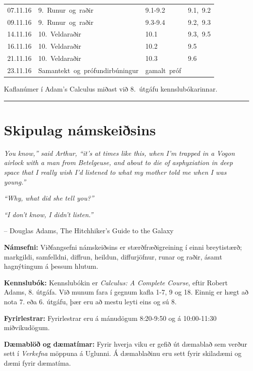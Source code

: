 \documentclass[b5paper,11pt,icelandic]{sphinxmanual}
\begin{document}
\begin{longtable}{c|l|l|l}
\hline

07.11.16&
9.~Runur~og~raðir&
9.1-9.2&
9.1,~9.2\\
09.11.16&
9.~Runur~og~raðir&
9.3-9.4&
9.2,~9.3\\

\hline

14.11.16&
10.~Veldaraðir&
10.1&
9.3,~9.5\\
16.11.16&
10.~Veldaraðir&
10.2&
9.5\\

\hline

21.11.16&
10.~Veldaraðir&
10.3&
9.6\\
23.11.16&
Samantekt~og~prófundirbúningur&
gamalt~próf&
\\
\hline
\end{longtable}


Kaflanúmer í Adam’s Calculus miðast við 8. útgáfu kennslubókarinnar.


\bigskip\hrule{}\bigskip

\newpage
 
\section{Skipulag námskeiðsins}
\label{vidauki:skipulag-namskeisins}
\emph{You know,'' said Arthur, ``it's at times like this, when I'm trapped in a
Vogon airlock with a man from Betelgeuse, and about to die of asphyxiation
in deep space that I really wish I'd listened to what my mother told me when I was young.''}

\emph{``Why, what did she tell you?''}

\emph{``I don't know, I didn't listen.”}

-- Douglas Adams, The Hitchhiker's Guide to the Galaxy

\textbf{Námsefni:} Viðfangsefni námskeiðsins er stærðfræðigreining í einni
breytistærð; markgildi, samfelldni, diffrun, heildun, diffurjöfnur,
runar og raðir, ásamt hagnýtingum á þessum hlutum.

\textbf{Kennslubók:} Kennslubókin er \emph{Calculus: A Complete Course}, eftir
Robert Adams, 8. útgáfa. Við munum fara í gegnum kafla 1-7, 9 og
18. Einnig er hægt að nota 7. eða 6. útgáfu, þær eru að mestu leyti eins og sú 8.

\textbf{Fyrirlestrar:} Fyrirlestrar eru á mánudögum 8:20-9:50 og á
10:00-11:30 miðvikudögum.

\textbf{Dæmablöð og dæmatímar:} Fyrir hverja viku er gefið út dæmablað sem
verður sett í \emph{Verkefna} möppuna á Uglunni. Á dæmablaðinu eru sett fyrir
skiladæmi og dæmi fyrir dæmatíma.
\end{document}
